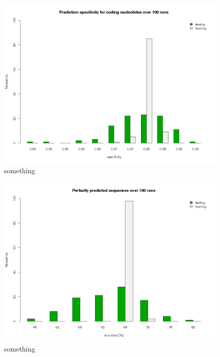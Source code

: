 \begin{figure}[ht]
	\begin{center}
		\includegraphics[scale=0.42]{pics/codingNucleotides_spec.png}
	\caption{something}
	\end{center}
	\label{fig:stateAgreement}
\end{figure}

\begin{figure}[ht]
	\begin{center}
		\includegraphics[scale=0.42]{pics/perfect2.png}
	\caption{something}
	\end{center}
	\label{fig:stateAgreement}
\end{figure}

